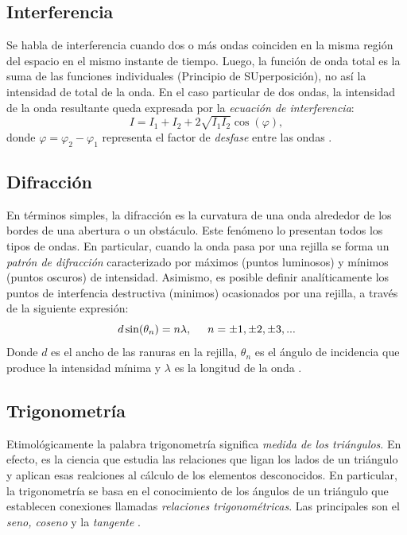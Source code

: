 \documentclass[10pt,a4paper]{article}
\begin{document}
\begin{multicols}{2}
		\subsection*{Interferencia} 
		Se habla de interferencia cuando dos o más ondas coinciden en la misma región del espacio en el mismo instante de tiempo. Luego, la función de onda total es la suma de las funciones individuales (Principio de SUperposición), no así la intensidad de total de la onda. En el caso particular de dos ondas, la intensidad de la onda resultante queda expresada por la \emph{ecuación de interferencia}:
		\begin{equation}
		I = I_1 + I_2 + 2\sqrt{I_1 I_2} \cos(\varphi),
		\end{equation}
		donde $\varphi = \varphi_2 - \varphi_1$ representa el factor de \emph{desfase} entre las ondas \cite{interferencia}.
		\subsection*{Difracción}
		En términos simples, la difracción es la curvatura de una onda alrededor de los bordes de una abertura o un obstáculo. Este fenómeno lo presentan todos los tipos de ondas. En particular, cuando la onda pasa por una rejilla se forma un \emph{patrón de difracción} caracterizado por máximos (puntos luminosos) y mínimos (puntos oscuros) de intensidad. Asimismo, es posible definir analíticamente los puntos de interfencia destructiva (minimos) ocasionados por una rejilla, a través de la siguiente expresión:
		\begin{equation}\label{minimos de intensidad}
		d \sin(\theta_n) = n \lambda, \hspace{5mm} n = \pm 1, \pm 2, \pm 3,... 
		\end{equation}
		Donde $d$ es el ancho de las ranuras en la rejilla, $\theta_n$ es el ángulo de incidencia que produce la intensidad mínima y $\lambda$ es la longitud de la onda \cite{wikidifrac}.
		\subsection*{Trigonometría}
		Etimológicamente la palabra trigonometría significa \textit{medida de los triángulos}. En efecto, es la ciencia que estudia las relaciones que ligan los lados de un triángulo y aplican esas realciones al cálculo de los elementos desconocidos. En particular, la trigonometría se basa en el conocimiento de los ángulos de un triángulo que establecen conexiones llamadas \textit{relaciones trigonométricas}. Las principales son el \emph{seno, coseno} y la \emph{tangente} \cite{trigonometria}.

\end{multicols}
\end{document}
